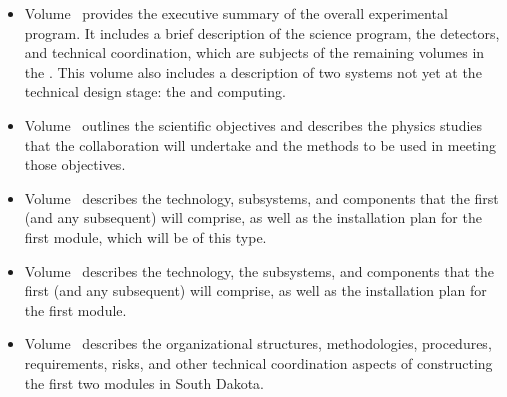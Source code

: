 \begin{itemize}
\item Volume~\volnumberexec{} provides the executive summary of the overall experimental program. It includes a brief description of the  science program, the  detectors, and technical coordination, which are subjects of the remaining volumes in the . This volume also includes a description of two systems not yet at the technical design stage: the   and  computing.
\item Volume~\volnumberphysics{} outlines the scientific objectives and describes the physics studies that the  collaboration will undertake and the methods to be used in meeting those objectives.
\item Volume~\volnumbersp{} describes the   technology, subsystems, and components that the first (and any subsequent)   will comprise, as well as the installation plan for the first  module, which will be of this type. 
\item Volume~\volnumberdp{} describes the   technology, the subsystems, and components that  the first (and any subsequent)   will comprise, as well as the installation plan for the first  module. 
\item Volume~\volnumbertc{} describes the organizational structures,  methodologies, procedures, requirements, risks, and other technical  coordination aspects of constructing the first two  modules in South Dakota.
\end{itemize}

